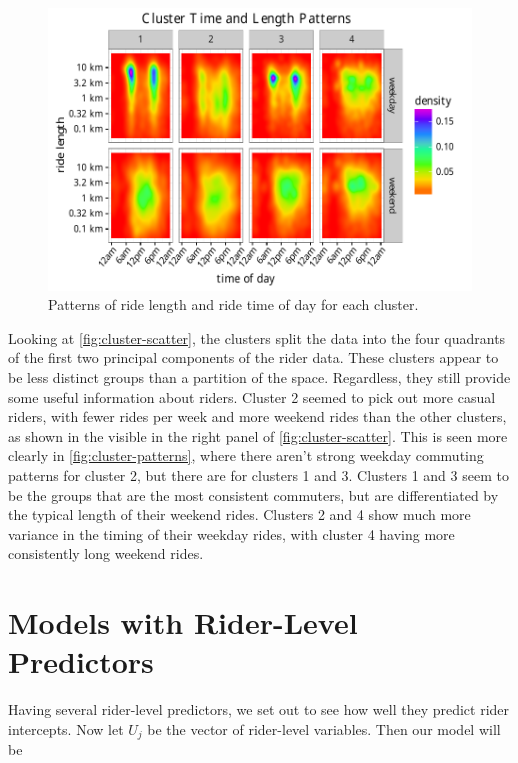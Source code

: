 \documentclass[12pt,twoside]{reedthesis}
\begin{document}
  \begin{figure}[bht]
  \centering
  \includegraphics[angle = 0,scale = 1]{figure/cluster_patterns.pdf}
  \caption[Patterns of ride length and ride time of day for each cluster.]{\normalsize{Patterns of ride length and ride time of day for each cluster.}}
  \label{fig:cluster-patterns}
  \end{figure}
  
  Looking at \autoref{fig:cluster-scatter}, the clusters split the data
  into the four quadrants of the first two principal components of the
  rider data. These clusters appear to be less distinct groups than a
  partition of the space. Regardless, they still provide some useful
  information about riders. Cluster 2 seemed to pick out more casual
  riders, with fewer rides per week and more weekend rides than the other
  clusters, as shown in the visible in the right panel of
  \autoref{fig:cluster-scatter}. This is seen more clearly in
  \autoref{fig:cluster-patterns}, where there aren't strong weekday
  commuting patterns for cluster 2, but there are for clusters 1 and 3.
  Clusters 1 and 3 seem to be the groups that are the most consistent
  commuters, but are differentiated by the typical length of their weekend
  rides. Clusters 2 and 4 show much more variance in the timing of their
  weekday rides, with cluster 4 having more consistently long weekend
  rides.
  
  \section{Models with Rider-Level Predictors}\label{stan-model}
  
  Having several rider-level predictors, we set out to see how well they
  predict rider intercepts. Now let \(U_j\) be the vector of rider-level
  variables. Then our model will be
  
\end{document}
